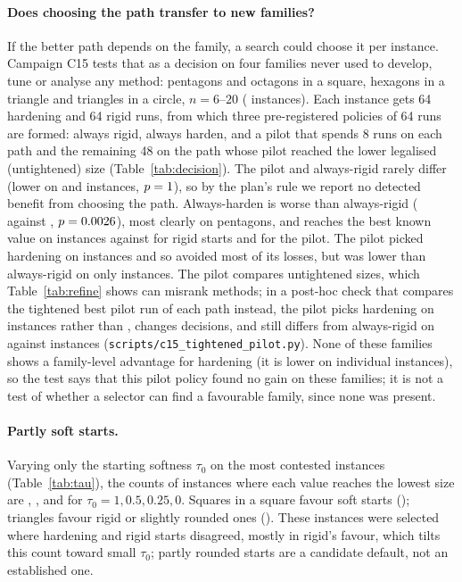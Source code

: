 \paragraph{Does choosing the path transfer to new families?} If the better path depends on the family, a search could choose it per instance. Campaign C15 tests that as a decision on four families never used to develop, tune or analyse any method: pentagons and octagons in a square, hexagons in a triangle and triangles in a circle, $n=6$--$20$ (\DecN{} instances). Each instance gets 64 hardening and 64 rigid runs, from which three pre-registered policies of 64 runs are formed: always rigid, always harden, and a pilot that spends 8 runs on each path and the remaining 48 on the path whose pilot reached the lower legalised (untightened) size (Table~\ref{tab:decision}). The pilot and always-rigid rarely differ (lower on \DecPilotLower{} and \DecRigidLower{} instances, $p=1$), so by the plan's rule we report no detected benefit from choosing the path. Always-harden is worse than always-rigid (\DecHLower{} against \DecHRLower, $p=0.0026$), most clearly on pentagons, and reaches the best known value on \DecReachedHarden{} instances against \DecReachedRigid{} for rigid starts and \DecReachedPilot{} for the pilot. The pilot picked hardening on \DecPicked{} instances and so avoided most of its losses, but was lower than always-rigid on only \DecPilotLower{} instances. The pilot compares untightened sizes, which Table~\ref{tab:refine} shows can misrank methods; in a post-hoc check that compares the tightened best pilot run of each path instead, the pilot picks hardening on \DecTPicked{} instances rather than \DecPicked, changes \DecTChanged{} decisions, and still differs from always-rigid on \DecTLower{} against \DecTRLower{} instances (\texttt{scripts/c15\_tightened\_pilot.py}). None of these families shows a family-level advantage for hardening (it is lower on \DecHLower{} individual instances), so the test says that this pilot policy found no gain on these families; it is not a test of whether a selector can find a favourable family, since none was present.


\paragraph{Partly soft starts.} Varying only the starting softness $\tau_0$ on the \CtauN{} most contested instances (Table~\ref{tab:tau}), the counts of instances where each value reaches the lowest size are \CtauOne, \CtauHalf, \CtauQuarter{} and \CtauZero{} for $\tau_0=1, 0.5, 0.25, 0$. Squares in a square favour soft starts (\CtauSquares{}); triangles favour rigid or slightly rounded ones (\CtauTriangles{}). These instances were selected where hardening and rigid starts disagreed, mostly in rigid's favour, which tilts this count toward small $\tau_0$; partly rounded starts are a candidate default, not an established one.


